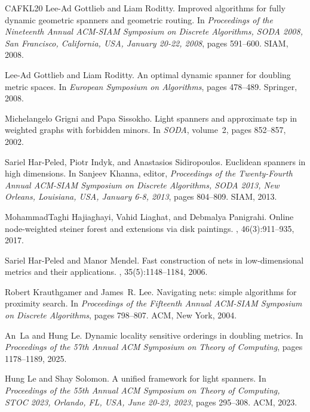\documentclass[11pt]{article}
\begin{document}
\begin{thebibliography}{CAFKL20}
Lee{-}Ad Gottlieb and Liam Roditty.
\newblock Improved algorithms for fully dynamic geometric spanners and
  geometric routing.
\newblock In {\em Proceedings of the Nineteenth Annual {ACM-SIAM} Symposium on
  Discrete Algorithms, {SODA} 2008, San Francisco, California, USA, January
  20-22, 2008}, pages 591--600. {SIAM}, 2008.

Lee-Ad Gottlieb and Liam Roditty.
\newblock An optimal dynamic spanner for doubling metric spaces.
\newblock In {\em European Symposium on Algorithms}, pages 478--489. Springer,
  2008.

Michelangelo Grigni and Papa Sissokho.
\newblock Light spanners and approximate tsp in weighted graphs with forbidden
  minors.
\newblock In {\em SODA}, volume~2, pages 852--857, 2002.

Sariel Har{-}Peled, Piotr Indyk, and Anastasios Sidiropoulos.
\newblock Euclidean spanners in high dimensions.
\newblock In Sanjeev Khanna, editor, {\em Proceedings of the Twenty-Fourth
  Annual {ACM-SIAM} Symposium on Discrete Algorithms, {SODA} 2013, New Orleans,
  Louisiana, USA, January 6-8, 2013}, pages 804--809. {SIAM}, 2013.

MohammadTaghi Hajiaghayi, Vahid Liaghat, and Debmalya Panigrahi.
\newblock Online node-weighted steiner forest and extensions via disk
  paintings.
, 46(3):911--935, 2017.

Sariel Har-Peled and Manor Mendel.
\newblock Fast construction of nets in low-dimensional metrics and their
  applications.
, 35(5):1148--1184, 2006.

Robert Krauthgamer and James~R. Lee.
\newblock Navigating nets: simple algorithms for proximity search.
\newblock In {\em Proceedings of the {F}ifteenth {A}nnual {ACM}-{SIAM}
  {S}ymposium on {D}iscrete {A}lgorithms}, pages 798--807. ACM, New York, 2004.

An~La and Hung Le.
\newblock Dynamic locality sensitive orderings in doubling metrics.
\newblock In {\em Proceedings of the 57th Annual ACM Symposium on Theory of
  Computing}, pages 1178--1189, 2025.

Hung Le and Shay Solomon.
\newblock A unified framework for light spanners.
\newblock In {\em Proceedings of the 55th Annual {ACM} Symposium on Theory of
  Computing, {STOC} 2023, Orlando, FL, USA, June 20-23, 2023}, pages 295--308.
  {ACM}, 2023.


\end{thebibliography}
\end{document}
